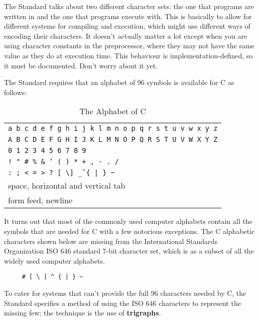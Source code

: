    The Standard talks about two different character sets: the one that
    programs are written in and the one that programs execute with. This is
    basically to allow for different systems for compiling and execution,
    which might use different ways of encoding their characters. It doesn't
    actually matter a lot except when you are using character constants in the
    preprocessor, where they may not have the same value as they do at
    execution time. This behaviour is implementation-defined, so it must be
    documented. Don't worry about it yet.


   The Standard requires that an alphabet of 96 symbols is available
    for C as follows:

    \begin{table}[htb]
      \centering
      \begin{tabular}{p{}}
        \toprule
        \texttt{a b c d e f g h i j k l m n o p q r s t u v w x y z}    \\
        \texttt{A B C D E F G H I J K L M N O P Q R S T U V W X Y Z}    \\
        \texttt{0 1 2 3 4 5 6 7 8 9}    \\
        \texttt{! " \# \% \& ' ( ) * + , - . /}    \\
        \texttt{: ; < = > ? [ \textbackslash ] \^ \_ \{ | \} \~}    \\
        space, horizontal and vertical tab    \\
        form feed, newline    \\
        \bottomrule
      \end{tabular}
      \caption{\label{tab:alphaC}The Alphabet of C}
    \end{table}



   It turns out that most of the commonly used computer alphabets contain
    all the symbols that are needed for C with a few notorious exceptions. The
    C alphabetic characters shown below are missing from the International
    Standards Organization ISO 646 standard 7-bit character set, which is
    as a subset of all the widely used computer alphabets.


   \begin{Verbatim}
     # [ \ ] ^ { | } ~
   \end{Verbatim}

   To cater for systems that can't provide the full 96 characters
    needed by C, the Standard specifies a method of using the
    ISO 646 characters to represent the missing few; the technique is the
    use of \textbf{trigraphs}.


